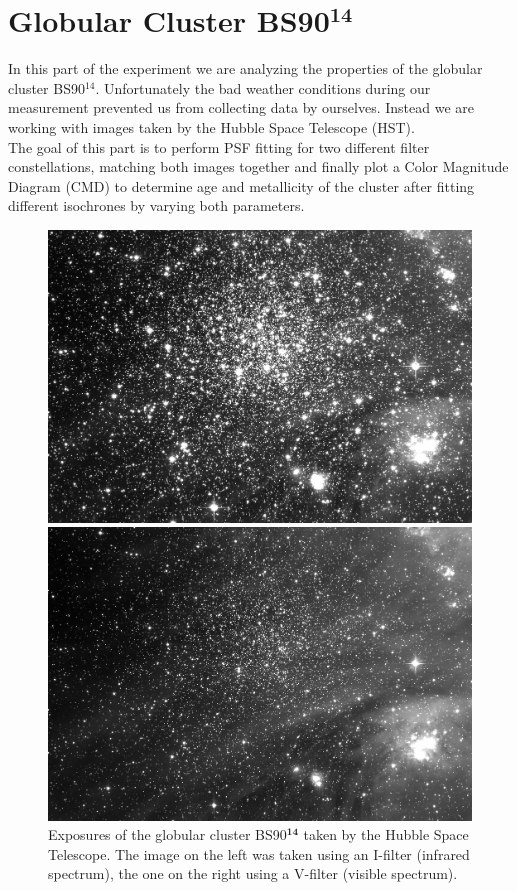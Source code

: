 \chapter{Globular Cluster BS90$^{\mathbf{14}}$}
In this part of the experiment we are analyzing the properties of the globular cluster BS90$^{14}$. Unfortunately the bad weather conditions during our measurement prevented us from collecting data by ourselves. Instead we are working with images taken by the Hubble Space Telescope (HST).\\
The goal of this part is to perform PSF fitting for two different filter constellations, matching both images together and finally plot a Color Magnitude Diagram (CMD) to determine age and metallicity of the cluster after fitting different isochrones by varying both parameters.
\begin{figure}[H]
\begin{minipage}{0.49\textwidth}
	\includegraphics[scale = 0.085]{figures/Exposures/BS90_I}
\end{minipage}
\hfill
\begin{minipage}{0.49\textwidth}
\includegraphics[scale = 0.085]{figures/Exposures/BS90_V}
\end{minipage}
\caption[Exposures of the globular cluster BS90$^{\mathbf{14}}$]{Exposures of the globular cluster BS90$^{\mathbf{14}}$ taken by the Hubble Space Telescope. The image on the left was taken using an I-filter (infrared spectrum), the one on the right using a V-filter (visible spectrum).}
\end{figure}

